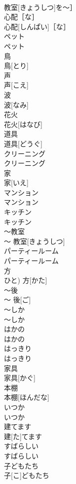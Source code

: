 \documentclass[8pt]{extreport}
\begin{document}
\begin{CJK}{UTF8}{min}
\\	教室[きょうしつ]を〜］	
\\	心配［な］	
\\	心配[しんぱい]［な］	
\\	ペット	
\\	ペット	
\\	鳥	
\\	鳥[とり]	
\\	声	
\\	声[こえ]	
\\	波	
\\	波[なみ]	
\\	花火	
\\	花火[はなび]	
\\	道具	
\\	道具[どうぐ]	
\\	クリーニング	
\\	クリーニング	
\\	家	
\\	家[いえ]	
\\	マンション	
\\	マンション	
\\	キッチン	
\\	キッチン	
\\	〜教室	
\\	〜 教室[きょうしつ]	
\\	パーティールーム	
\\	パーティールーム	
\\	方	
\\	ひと)	方[かた]	
\\	〜後	
\\	〜 後[ご]	
\\	〜しか	
\\	〜しか	
\\	はかの	
\\	はかの	
\\	はっきり	
\\	はっきり	
\\	家具	
\\	家具[かぐ]	
\\	本棚	
\\	本棚[ほんだな]	
\\	いつか	
\\	いつか	
\\	建てます	
\\	建[た]てます	
\\	すばらしい	
\\	すばらしい	
\\	子どもたち	
\\	子[こ]どもたち	

\end{CJK}
\end{document}
